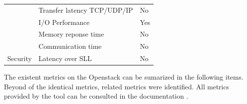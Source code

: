 \documentclass[conference]{IEEEtran}
\begin{document}
\begin{table}[ht]
\begin{tabular}{@{}lll@{}}
                                       & Transfer latency TCP/UDP/IP                                                    & No                                           \\
                                       & I/O Performance                                                                    & Yes                                           \\
                                       & Memory reponse time                                                           & No                                           \\
                                       & Communication time                                                                  & No                                           \\
Security                              & Latency over SLL                                                     & No                                           \\ \bottomrule
\end{tabular}
\end{table}  


The existent metrics on the Openstack can be sumarized in the following items. Beyond of the identical metrics, related metrics were identified.
All metrics provided by the tool can be consulted in the documentation \cite{openstack}.
\end{document}
